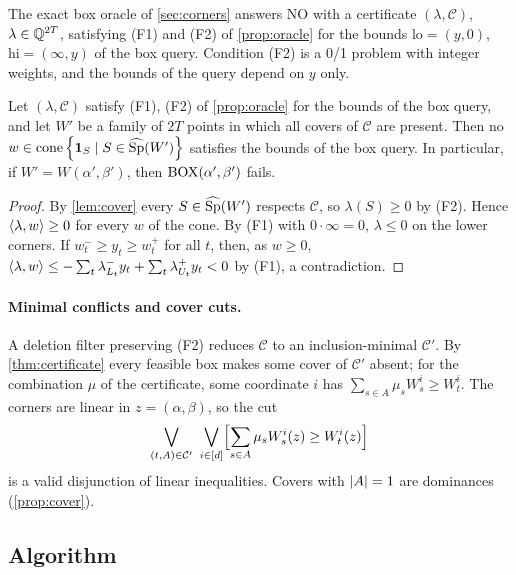 The exact box oracle of \cref{sec:corners} answers NO with a certificate $(\lambda,\mathcal C)$, $\lambda\in\mathbb{Q}^{2T}$, satisfying (F1) and (F2) of \cref{prop:oracle} for the bounds $\mathrm{lo}=(y,0)$, $\mathrm{hi}=(\infty,y)$ of the box query. Condition (F2) is a 0/1 problem with integer weights, and the bounds of the query depend on $y$ only.
\begin{theorem}[certificate]\label{thm:certificate}
Let $(\lambda,\mathcal C)$ satisfy (F1), (F2) of \cref{prop:oracle} for the bounds of the box query, and let $W'$ be a family of $2T$ points in which all covers of $\mathcal C$ are present. Then no $w\in\operatorname{cone}\left\{ \mathbf 1_{S}\mid S\in\widehat{\operatorname{Sp}}(W') \right\}$ satisfies the bounds of the box query. In particular, if $W'=W(\alpha',\beta')$, then $\mathrm{BOX}(\alpha',\beta')$ fails.
\end{theorem}
\begin{proof}
By \cref{lem:cover} every $S\in\widehat{\operatorname{Sp}}(W')$ respects $\mathcal C$, so $\lambda(S)\ge0$ by (F2). Hence $\langle \lambda, w\rangle\ge0$ for every $w$ of the cone. By (F1) with $0\cdot\infty=0$, $\lambda\le0$ on the lower corners. If $w^-_t\ge y_t\ge w^+_t$ for all $t$, then, as $w\ge0$, $\langle \lambda, w\rangle\le-\sum_t\lambda^-_{L_t}y_t+\sum_t\lambda^+_{U_t}y_t<0$ by (F1), a contradiction.
\end{proof}

\paragraph{Minimal conflicts and cover cuts.}\label{sec:conflicts}
A deletion filter preserving (F2) \citep{CodatoFischetti2006} reduces $\mathcal C$ to an inclusion-minimal $\mathcal C'$. By \cref{thm:certificate} every feasible box makes some cover of $\mathcal C'$ absent; for the combination $\mu$ of the certificate, some coordinate $i$ has $\sum_{s\in A}\mu_sW^i_s\ge W^i_t$. The corners are linear in $z=(\alpha,\beta)$, so the cut
\[
\bigvee_{(t,A)\in\mathcal C'}\ \bigvee_{i\in[d]}\Bigl[\sum_{s\in A}\mu_sW^i_s(z)\ge W^i_t(z)\Bigr]
\]
is a valid disjunction of linear inequalities. Covers with $\left\lvert A \right\rvert=1$ are dominances (\cref{prop:cover}).

\subsection{Algorithm}\label{sec:algo}
